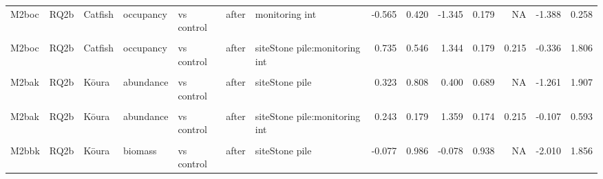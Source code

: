 \documentclass[
  12pt,
  a4paper,
  oneside]{scrbook}
\begin{document}
\begin{landscape}
\begin{longtable}[t]{lllllllrrrrrrr}
M2boc & RQ2b & Catfish & occupancy & vs control & after & monitoring int & -0.565 & 0.420 & -1.345 & 0.179 & NA & -1.388 & 0.258\\
\cellcolor{gray!8}{M2boc} & \cellcolor{gray!8}{RQ2b} & \cellcolor{gray!8}{Catfish} & \cellcolor{gray!8}{occupancy} & \cellcolor{gray!8}{vs control} & \cellcolor{gray!8}{after} & \cellcolor{gray!8}{fetch z} & \cellcolor{gray!8}{-0.858} & \cellcolor{gray!8}{1.121} & \cellcolor{gray!8}{-0.766} & \cellcolor{gray!8}{0.444} & \cellcolor{gray!8}{NA} & \cellcolor{gray!8}{-3.055} & \cellcolor{gray!8}{1.339}\\
\addlinespace
M2boc & RQ2b & Catfish & occupancy & vs control & after & siteStone pile:monitoring int & 0.735 & 0.546 & 1.344 & 0.179 & 0.215 & -0.336 & 1.806\\
\cellcolor{gray!8}{M2bak} & \cellcolor{gray!8}{RQ2b} & \cellcolor{gray!8}{Kōura} & \cellcolor{gray!8}{abundance} & \cellcolor{gray!8}{vs control} & \cellcolor{gray!8}{after} & \cellcolor{gray!8}{(Intercept)} & \cellcolor{gray!8}{0.084} & \cellcolor{gray!8}{0.846} & \cellcolor{gray!8}{0.099} & \cellcolor{gray!8}{0.921} & \cellcolor{gray!8}{NA} & \cellcolor{gray!8}{-1.573} & \cellcolor{gray!8}{1.741}\\
M2bak & RQ2b & Kōura & abundance & vs control & after & siteStone pile & 0.323 & 0.808 & 0.400 & 0.689 & NA & -1.261 & 1.907\\
\cellcolor{gray!8}{M2bak} & \cellcolor{gray!8}{RQ2b} & \cellcolor{gray!8}{Kōura} & \cellcolor{gray!8}{abundance} & \cellcolor{gray!8}{vs control} & \cellcolor{gray!8}{after} & \cellcolor{gray!8}{monitoring int} & \cellcolor{gray!8}{-0.409} & \cellcolor{gray!8}{0.143} & \cellcolor{gray!8}{-2.861} & \cellcolor{gray!8}{0.004} & \cellcolor{gray!8}{NA} & \cellcolor{gray!8}{-0.690} & \cellcolor{gray!8}{-0.129}\\
M2bak & RQ2b & Kōura & abundance & vs control & after & siteStone pile:monitoring int & 0.243 & 0.179 & 1.359 & 0.174 & 0.215 & -0.107 & 0.593\\
\addlinespace
\cellcolor{gray!8}{M2bbk} & \cellcolor{gray!8}{RQ2b} & \cellcolor{gray!8}{Kōura} & \cellcolor{gray!8}{biomass} & \cellcolor{gray!8}{vs control} & \cellcolor{gray!8}{after} & \cellcolor{gray!8}{(Intercept)} & \cellcolor{gray!8}{3.270} & \cellcolor{gray!8}{0.856} & \cellcolor{gray!8}{3.821} & \cellcolor{gray!8}{0.000} & \cellcolor{gray!8}{NA} & \cellcolor{gray!8}{1.593} & \cellcolor{gray!8}{4.948}\\
M2bbk & RQ2b & Kōura & biomass & vs control & after & siteStone pile & -0.077 & 0.986 & -0.078 & 0.938 & NA & -2.010 & 1.856\\

\end{longtable}
\end{landscape}
\end{document}
